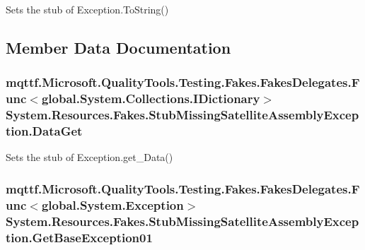 Sets the stub of Exception.\-To\-String()



\subsection{Member Data Documentation}
\hypertarget{class_system_1_1_resources_1_1_fakes_1_1_stub_missing_satellite_assembly_exception_a02ea66a2361d0f2aa322a023e603829b}{
\subsubsection[{Data\-Get}]{\setlength{\rightskip}{0pt plus 5cm}mqttf.\-Microsoft.\-Quality\-Tools.\-Testing.\-Fakes.\-Fakes\-Delegates.\-Func$<$global.\-System.\-Collections.\-I\-Dictionary$>$ System.\-Resources.\-Fakes.\-Stub\-Missing\-Satellite\-Assembly\-Exception.\-Data\-Get}}\label{class_system_1_1_resources_1_1_fakes_1_1_stub_missing_satellite_assembly_exception_a02ea66a2361d0f2aa322a023e603829b}


Sets the stub of Exception.\-get\-\_\-\-Data()

\hypertarget{class_system_1_1_resources_1_1_fakes_1_1_stub_missing_satellite_assembly_exception_a5b9f126d026817a3663deee2b4f4b806}{
\subsubsection[{Get\-Base\-Exception01}]{\setlength{\rightskip}{0pt plus 5cm}mqttf.\-Microsoft.\-Quality\-Tools.\-Testing.\-Fakes.\-Fakes\-Delegates.\-Func$<$global.\-System.\-Exception$>$ System.\-Resources.\-Fakes.\-Stub\-Missing\-Satellite\-Assembly\-Exception.\-Get\-Base\-Exception01}}\label{class_system_1_1_resources_1_1_fakes_1_1_stub_missing_satellite_assembly_exception_a5b9f126d026817a3663deee2b4f4b806}


